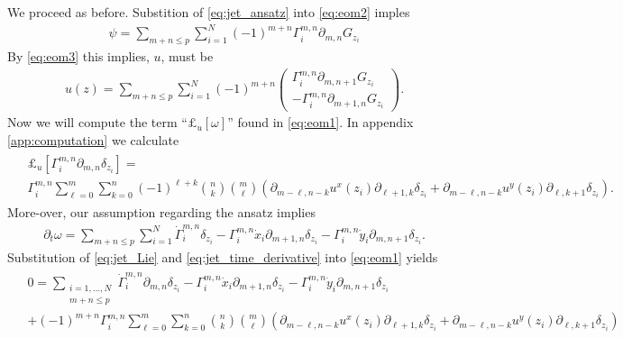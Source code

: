 \documentclass[12pt]{amsart}
\begin{document}
We proceed as before. Substition of \eqref{eq:jet_ansatz} into \eqref{eq:eom2} imples
\begin{align*}
  \psi = \sum_{m+n \leq p} \sum_{i=1}^N (-1)^{m+n}\Gamma_i^{m,n} \partial_{m,n} G_{z_i}
\end{align*}
By \eqref{eq:eom3} this implies, $u$, must be
\begin{align}
  u(z) = \sum_{m+n \leq p} \sum_{i=1}^N (-1)^{m+n}
  \begin{pmatrix}
    \Gamma_i^{m,n} \partial_{m,n+1} G_{z_i} \\
    -\Gamma_i^{m,n} \partial_{m+1,n} G_{z_i}
  \end{pmatrix}. \label{eq:jet_u}
\end{align}
Now we will compute the term ``$\pounds_u[\omega]$'' found in \eqref{eq:eom1}.
In appendix \ref{app:computation} we calculate
\begin{align}
  \begin{split}
  &\pounds_u[\Gamma_i^{m,n} \partial_{m,n} \delta_{z_i}] =\\
  &\Gamma_i^{m,n}
  \sum_{\ell=0}^m \sum_{k=0}^n
  (-1)^{\ell + k} \binom{n}{k} \binom{m}{\ell}
   \left(\partial_{m-\ell,n-k}u^x(z_i) \partial_{\ell+1,k} \delta_{z_i}
     +\partial_{m-\ell,n-k}u^y(z_i) \partial_{\ell,k+1} \delta_{z_i}
     \right)
   .
   \end{split}\label{eq:jet_Lie}
\end{align}
More-over, our assumption regarding the ansatz implies
\begin{align}
  \partial_t \omega = \sum_{m+n \leq p} \sum_{i=1}^N \dot{\Gamma}_i^{m,n} \delta_{z_i} - \Gamma_i^{m,n} \dot{x}_i \partial_{m+1,n} \delta_{z_i} - \Gamma_i^{m,n} \dot{y}_i \partial_{m,n+1} \delta_{z_i}. \label{eq:jet_time_derivative}
\end{align}
Substitution of \eqref{eq:jet_Lie} and \eqref{eq:jet_time_derivative} into \eqref{eq:eom1} yields
\begin{align}
  \begin{split}
    &0=\sum_{
    	\substack{
		i=1,\dots,N\\
		m+n \leq p}
		}
		\dot{\Gamma}_i^{m,n} \partial_{m,n} \delta_{z_i} - \Gamma_i^{m,n} \dot{x}_i \partial_{m+1,n} \delta_{z_i} - \Gamma_i^{m,n} \dot{y}_i \partial_{m,n+1} \delta_{z_i} \\
   & +  (-1)^{m+n} \Gamma_i^{m,n} \sum_{\ell=0}^m \sum_{k=0}^n \binom{n}{k} \binom{m}{\ell}
   \left(\partial_{m-\ell,n-k}u^x(z_i) \partial_{\ell+1,k} \delta_{z_i}
     +\partial_{m-\ell,n-k}u^y(z_i) \partial_{\ell,k+1} \delta_{z_i}
     \right)
  \end{split}
  \label{eq:eom4}
\end{align}
\end{document}
